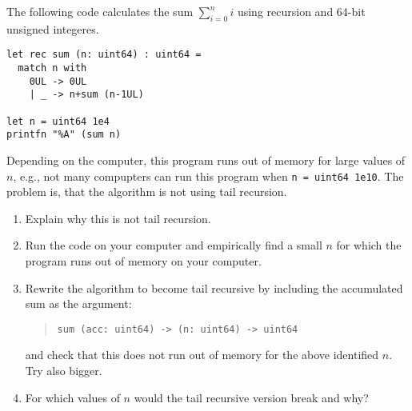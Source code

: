 The following code calculates the sum $\sum_{i=0}^ni$ using recursion and 64-bit unsigned integeres.
\begin{lstlisting}
let rec sum (n: uint64) : uint64 =
  match n with
    0UL -> 0UL
    | _ -> n+sum (n-1UL)

let n = uint64 1e4
printfn "%A" (sum n)
\end{lstlisting}
Depending on the computer, this program runs out of memory for large values of $n$, e.g., not many compupters can run this program when \lstinline{n = uint64 1e10}. The problem is, that the algorithm is not using tail recursion.
\begin{enumerate}
\item Explain why this is not tail recursion.
\item Run the code on your computer and empirically find a small $n$ for which the program runs out of memory on your computer.
\item Rewrite the algorithm to become tail recursive by including the accumulated sum as the argument:
\begin{quote}
\lstinline{sum (acc: uint64) -> (n: uint64) -> uint64}
\end{quote}
and check that this does not run out of memory for the above identified $n$. Try also bigger.
\item For which values of $n$ would the tail recursive version break and why?
\end{enumerate}
